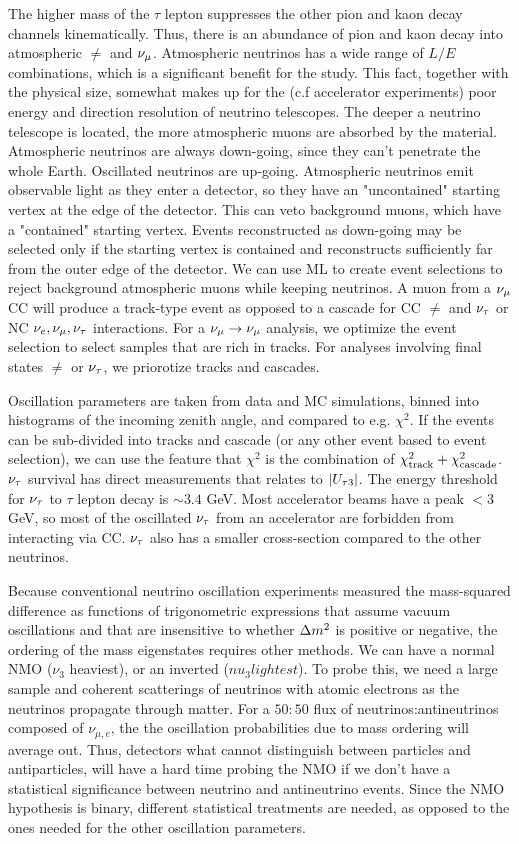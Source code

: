 \documentclass[twocolumn]{article}
\begin{document}
The higher mass of the $\tau$ lepton suppresses the other pion and kaon decay channels kinematically. Thus, there is an abundance of pion and kaon decay into atmospheric $\ne$ and $\nu_\mu$. Atmospheric neutrinos has a wide range of $L / E$ combinations, which is a significant benefit for the study. This fact, together with the physical size, somewhat makes up for the (c.f accelerator experiments) poor energy and direction resolution of neutrino telescopes. The deeper a neutrino telescope is
located, the more atmospheric muons are absorbed by the material. Atmospheric neutrinos are always down-going, since they can't penetrate the whole Earth. Oscillated neutrinos are up-going. Atmospheric neutrinos emit observable light as they enter a detector, so they have an "uncontained" starting vertex at the edge of the detector. This can veto background muons, which have a "contained" starting vertex. Events reconstructed as down-going may be selected only if the starting vertex is contained and reconstructs sufficiently far from the outer edge of the detector. We can use ML to create event selections to reject background atmospheric muons while keeping neutrinos. A muon from a $\nu_\mu$ CC will produce a track-type event as opposed to a cascade for CC $\ne$ and $\nu_\tau$ or NC $\nu_e, \nu_\mu, \nu_\tau$ interactions. For a $\nu_\mu \to \nu_\mu$ analysis, we optimize the event selection to select samples that are rich in tracks. For analyses involving final states $\ne$ or $\nu_\tau$, we priorotize tracks and cascades.

Oscillation parameters are taken from data and MC simulations, binned into histograms of the incoming zenith angle, and compared to e.g. $\chi^2$. If the events can be sub-divided into tracks and cascade (or any other event based to event selection), we can use the feature that $\chi^2$ is the combination of $\chi^2_{\text{{track}}} + \chi^2_{\text{{cascade}}}$.
$\nu_\tau$ survival has direct measurements that relates to $\abs{U_{\tau 3}}$. The energy threshold for $\nu_\tau$ to $\tau$ lepton decay is $\sim 3.4$ GeV. Most accelerator beams have a peak $< 3$ GeV, so most of the oscillated $\nu_\tau$ from an accelerator are forbidden from interacting via CC. $\nu_\tau$ also has a smaller cross-section compared to the other neutrinos. 

Because conventional neutrino oscillation experiments measured the mass-squared difference as functions of trigonometric expressions that assume vacuum oscillations and that are insensitive to whether $\dm$ is positive or negative, the ordering of the mass eigenstates requires other methods. We can have a normal NMO ($\nu_3$ heaviest), or an inverted ($nu_3 lightest$). To probe this, we need a large sample and coherent scatterings of neutrinos with atomic electrons as the neutrinos propagate through matter. For a $50:50$ flux of neutrinos:antineutrinos composed of $\nu_{\mu,e}$, the the oscillation probabilities due to mass ordering will average out. Thus, detectors what cannot distinguish between particles and antiparticles, will have a hard time probing the NMO if we don't have a statistical significance between neutrino and antineutrino events. Since the NMO hypothesis is binary, different statistical treatments are needed, as opposed to the ones needed for the other oscillation parameters.
\end{document}
